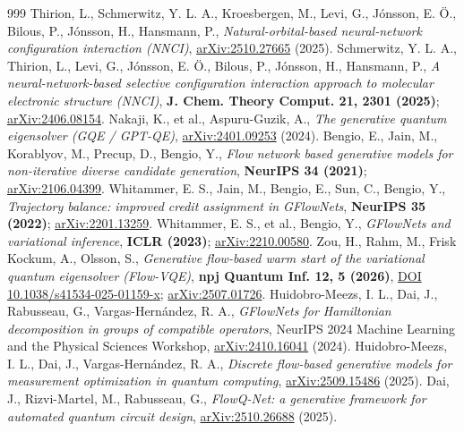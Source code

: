 \documentclass[onecolumn,a4paper]{quantumarticle}
\begin{document}
\begin{thebibliography}{999}
 Thirion, L., Schmerwitz, Y. L. A., Kroesbergen, M., Levi, G., Jónsson, E. Ö., Bilous, P., Jónsson, H., Hansmann, P., \emph{Natural-orbital-based neural-network configuration interaction (NNCI)}, \href{https://arxiv.org/abs/2510.27665}{arXiv:2510.27665} (2025).
 Schmerwitz, Y. L. A., Thirion, L., Levi, G., Jónsson, E. Ö., Bilous, P., Jónsson, H., Hansmann, P., \emph{A neural-network-based selective configuration interaction approach to molecular electronic structure (NNCI)}, \textbf{J. Chem. Theory Comput. 21, 2301 (2025)}; \href{https://arxiv.org/abs/2406.08154}{arXiv:2406.08154}.
 Nakaji, K., et al., Aspuru-Guzik, A., \emph{The generative quantum eigensolver (GQE / GPT-QE)}, \href{https://arxiv.org/abs/2401.09253}{arXiv:2401.09253} (2024).
 Bengio, E., Jain, M., Korablyov, M., Precup, D., Bengio, Y., \emph{Flow network based generative models for non-iterative diverse candidate generation}, \textbf{NeurIPS 34 (2021)}; \href{https://arxiv.org/abs/2106.04399}{arXiv:2106.04399}.
 Whitammer, E. S., Jain, M., Bengio, E., Sun, C., Bengio, Y., \emph{Trajectory balance: improved credit assignment in GFlowNets}, \textbf{NeurIPS 35 (2022)}; \href{https://arxiv.org/abs/2201.13259}{arXiv:2201.13259}.
 Whitammer, E. S., et al., Bengio, Y., \emph{GFlowNets and variational inference}, \textbf{ICLR (2023)}; \href{https://arxiv.org/abs/2210.00580}{arXiv:2210.00580}.
 Zou, H., Rahm, M., Frisk Kockum, A., Olsson, S., \emph{Generative flow-based warm start of the variational quantum eigensolver (Flow-VQE)}, \textbf{npj Quantum Inf. 12, 5 (2026)}, \href{https://doi.org/10.1038/s41534-025-01159-x}{DOI 10.1038/s41534-025-01159-x}; \href{https://arxiv.org/abs/2507.01726}{arXiv:2507.01726}.
 Huidobro-Meezs, I. L., Dai, J., Rabusseau, G., Vargas-Hern\'andez, R. A., \emph{GFlowNets for Hamiltonian decomposition in groups of compatible operators}, NeurIPS 2024 Machine Learning and the Physical Sciences Workshop, \href{https://arxiv.org/abs/2410.16041}{arXiv:2410.16041} (2024).
 Huidobro-Meezs, I. L., Dai, J., Vargas-Hern\'andez, R. A., \emph{Discrete flow-based generative models for measurement optimization in quantum computing}, \href{https://arxiv.org/abs/2509.15486}{arXiv:2509.15486} (2025).
 Dai, J., Rizvi-Martel, M., Rabusseau, G., \emph{FlowQ-Net: a generative framework for automated quantum circuit design}, \href{https://arxiv.org/abs/2510.26688}{arXiv:2510.26688} (2025).

\end{thebibliography}
\end{document}
